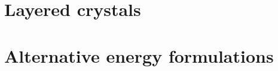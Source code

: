 \section{Layered crystals}
\label{sec:layered_crystals}



\section{Alternative energy formulations}

\label{sec:empirical_potentials}


























































































